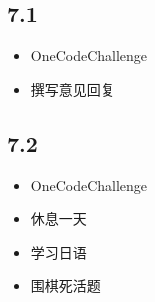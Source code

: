 \documentclass[UTF8]{ctexart}
\begin{document}
\subsection*{7.1}
\begin{itemize}
    \item OneCodeChallenge
    \item 撰写意见回复
\end{itemize}

\subsection*{7.2}
\begin{itemize}
    \item OneCodeChallenge
    \item 休息一天
    \item 学习日语
    \item 围棋死活题
\end{itemize}
\end{document}
